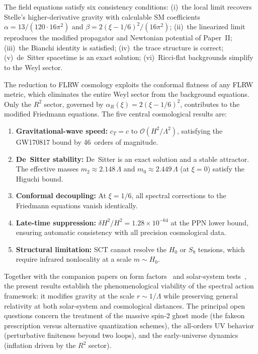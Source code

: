 \documentclass[12pt,a4paper]{article}
\newcommand{\order}{\mathcal{O}}
\newcommand{\Lam}{\Lambda}
\theoremstyle{plain}
\theoremstyle{definition}
\begin{document}
The field equations satisfy six consistency conditions:
(i)~the local limit recovers Stelle's higher-derivative gravity with
calculable SM coefficients $\alpha = 13/(120 \cdot 16\pi^2)$ and
$\beta = 2(\xi-1/6)^2/(16\pi^2)$;
(ii)~the linearized limit reproduces the modified propagator and
Newtonian potential of Paper~II;
(iii)~the Bianchi identity is satisfied;
(iv)~the trace structure is correct;
(v)~de~Sitter spacetime is an exact solution;
(vi)~Ricci-flat backgrounds simplify to the Weyl sector.

The reduction to FLRW cosmology exploits the conformal flatness of any
FLRW metric, which eliminates the entire Weyl sector from the background
equations.  Only the $R^2$ sector, governed by
$\alpha_R(\xi) = 2(\xi - 1/6)^2$, contributes to the modified Friedmann
equations.  The five central cosmological results are:

\begin{enumerate}
  \item \textbf{Gravitational-wave speed:}  $c_T = c$ to
    $\order(H^2/\Lam^2)$, satisfying the GW170817 bound by 46~orders
    of magnitude.

  \item \textbf{De~Sitter stability:}  De~Sitter is an exact solution
    and a stable attractor.  The effective masses
    $m_2 \approx 2.148\,\Lam$ and $m_0 \approx 2.449\,\Lam$ (at
    $\xi = 0$) satisfy the Higuchi bound.

  \item \textbf{Conformal decoupling:}  At $\xi = 1/6$, all spectral
    corrections to the Friedmann equations vanish identically.

  \item \textbf{Late-time suppression:}
    $\delta H^2/H^2 = 1.28 \times 10^{-64}$ at the PPN lower bound,
    ensuring automatic consistency with all precision cosmological data.

  \item \textbf{Structural limitation:}  SCT cannot resolve the $H_0$ or
    $S_8$ tensions, which require infrared nonlocality at a scale
    $m \sim H_0$.
\end{enumerate}

Together with the companion papers on form
factors~\cite{Alfyorov:2026ff} and solar-system
tests~\cite{Alfyorov:2026ss}, the present results establish the
phenomenological viability of the spectral action framework: it modifies
gravity at the scale $r \sim 1/\Lam$ while preserving general relativity
at both solar-system and cosmological distances.  The principal open
questions concern the treatment of the massive spin-2 ghost mode (the
fakeon prescription versus alternative quantization schemes), the
all-orders UV behavior (perturbative finiteness beyond two loops), and the
early-universe dynamics (inflation driven by the $R^2$ sector).
\end{document}
